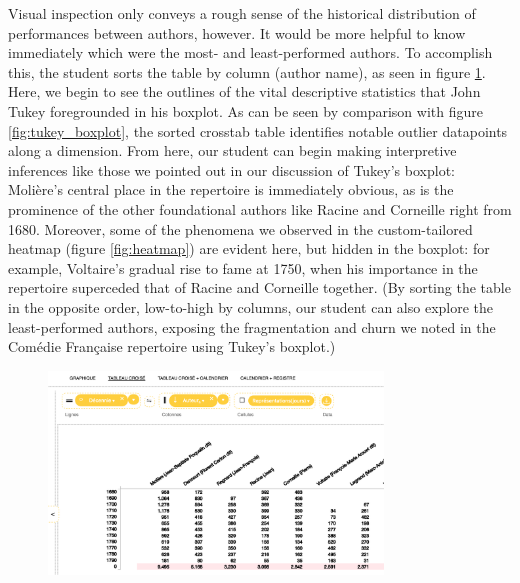 \documentclass[	DIV=calc,%
							paper=a4,%
							fontsize=11pt,%
							twocolumn]{scrartcl}	 					%
\begin{document}
Visual inspection only conveys a rough sense of the historical distribution of performances between authors, however.  It would be more helpful to know immediately which were the most- and least-performed authors.  To accomplish this, the student sorts the table by column (author name), as seen in figure \ref{fig:sorted}.  Here, we begin to see the outlines of the vital descriptive statistics that John Tukey foregrounded in his boxplot.  As can be seen by comparison with figure \ref{fig:tukey_boxplot}, the sorted crosstab table identifies notable outlier datapoints along a dimension.  From here, our student can begin making interpretive inferences like those we pointed out in our discussion of Tukey’s boxplot: Molière’s central place in the repertoire is immediately obvious, as is the prominence of the other foundational authors like Racine and Corneille right from 1680.  Moreover, some of the phenomena we observed in the custom-tailored heatmap (figure \ref{fig:heatmap}) are evident here, but hidden in the boxplot: for example, Voltaire’s gradual rise to fame at 1750, when his importance in the repertoire superceded that of Racine and Corneille together.  (By sorting the table in the opposite order, low-to-high by columns, our student can also explore the least-performed authors, exposing  the fragmentation and churn we noted in the Comédie Française repertoire using Tukey’s boxplot.)

\begin{figure}
  \centering
	\includegraphics[width=3.5in]{steps/sorted.png}
	\caption{}
	\label{fig:sorted}
\end{figure}
\end{document}
